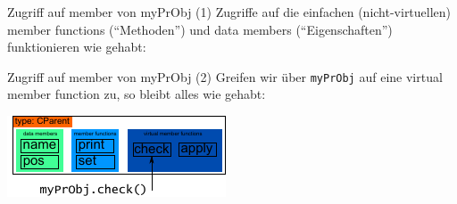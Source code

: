 \begin{frame}[fragile,b]{Zugriff auf member von myPrObj (1)}
	Zugriffe auf die einfachen (nicht-virtuellen) member functions (\enquote{Methoden}) und data members (\enquote{Eigenschaften}) funktionieren wie gehabt:
	
	\vspace{2em}
	
\end{frame}

\begin{frame}[fragile,b]{Zugriff auf member von myPrObj (2)}
	Greifen wir über \verb|myPrObj| auf eine virtual member function zu, so bleibt alles wie gehabt:
	
	\vspace{2em}
	
	\includegraphics[width=0.5\linewidth]{images/myPrObj-check}
\end{frame}

